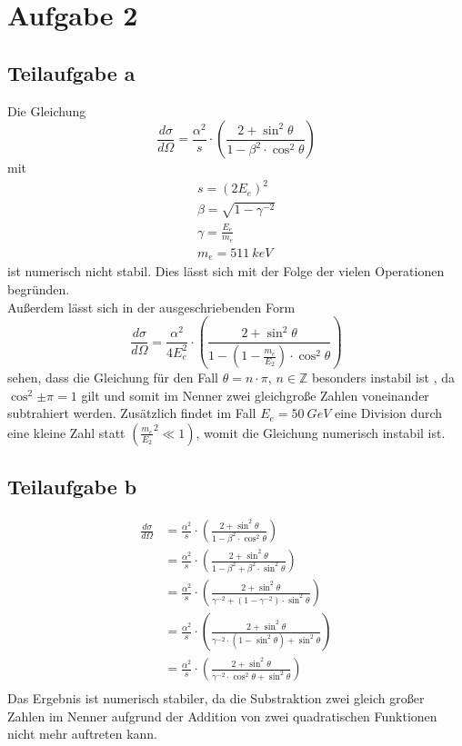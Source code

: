 \section{Aufgabe 2}
\subsection{Teilaufgabe a}
Die Gleichung
\begin{equation}
  \frac{d \sigma}{d \Omega}=\frac{\alpha ^2}{s} \cdot \left(\frac{2+\sin^2{\theta}}{1-\beta^2 \cdot \cos^2{\theta}} \right)
\end{equation}
mit
\begin{align*}
  s=\left( 2E_e\right)^2 \\
  \beta=\sqrt{1-\gamma^{-2}} \\
  \gamma=\frac{E_e}{m_e} \\
  m_e= \SI{511}{keV}
\end{align*}
ist numerisch nicht stabil. Dies lässt sich mit der Folge der vielen Operationen begründen. \\
Außerdem lässt sich in der ausgeschriebenden Form
\begin{equation}
  \frac{d \sigma}{d \Omega}=\frac{\alpha ^2}{4E^2_{e}} \cdot \left(\frac{2+\sin^2{\theta}}{1-\left(1-\frac{m_{e}}{E_{2}} \right) \cdot \cos^2{\theta}} \right)
\end{equation}
sehen, dass die Gleichung für den Fall $\theta = n \cdot \pi$, $n \in \mathbb{Z}$ besonders instabil ist , da
$\cos^2{\pm \pi}=1$ gilt und somit im Nenner  zwei gleichgroße Zahlen voneinander subtrahiert werden.
Zusätzlich findet im Fall $E_e=\SI{50}{GeV}$ eine Division durch eine kleine Zahl statt $\left( {\frac{m_{e}}{E_{2}}}^2 \ll 1 \right)$, womit die Gleichung numerisch instabil ist.


\subsection{Teilaufgabe b} \label{sec:2b}

\begin{align}
  \frac{d \sigma}{d \Omega} &= \frac{\alpha ^2}{s} \cdot \left(\frac{2+\sin^2{\theta}}{1-\beta^2 \cdot \cos^2{\theta}} \right) \\
  &=\frac{\alpha ^2}{s} \cdot \left(\frac{2+\sin^2{\theta}}{1-\beta^2 + \beta^2 \cdot \sin^2{\theta}} \right) \\
  &=\frac{\alpha ^2}{s} \cdot \left(\frac{2+\sin^2{\theta}}{\gamma^{-2} + \left(1-\gamma^{-2} \right) \cdot \sin^2{\theta}} \right) \\
  &=\frac{\alpha ^2}{s} \cdot \left(\frac{2+\sin^2{\theta}}{\gamma^{-2} \cdot \left(1-\sin^{2}{\theta} \right) + \sin^2{\theta}} \right) \\
  &=\frac{\alpha ^2}{s} \cdot \left(\frac{2+\sin^2{\theta}}{\gamma^{-2} \cdot \cos^2{\theta} + \sin^2{\theta}} \right)  \label{eqn:dwqsb}\\
\end{align}
Das Ergebnis ist numerisch stabiler, da die Substraktion zwei gleich großer Zahlen im Nenner aufgrund der Addition von zwei quadratischen Funktionen nicht mehr auftreten kann.

